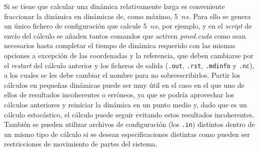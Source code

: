             Si se tiene que calcular una dinámica relativamente larga es conveniente fraccionar la dinámica en dinámicas de, como máximo, 5~$ns$. Para ello se genera un único fichero de configuración que calcule 5~$ns$, por ejemplo, y en el \textit{script} de envío del cálculo se añaden tantos comandos que activen \textit{pmed.cuda} como sean necesarios hasta completar el tiempo de dinámica requerido con las mismas opciones a excepción de las coordenadas y la referencia, que deben cambiarse por el \textit{restart} del cálculo anterior y los ficheros de salida (\texttt{.out}, \texttt{.rst}, \texttt{.mdinfo} y \texttt{.nc}), a los cuales se les debe cambiar el nombre para no sobreescribirlos. Partir los cálculos en pequeñas dinámicas puede ser muy útil en el caso en el que uno de ellos de resultados incoherentes o erróneos, ya que se podría aprovechar los cálculos anteriores y reiniciar la dinámica en un punto medio y, dado que es un cálculo estocástico, el cálculo puede seguir evitando estos resultados incoherentes. También se pueden utilizar archivos de configuración (los \texttt{.in}) distintos dentro de un mismo tipo de cálculo si se desean especificaciones distintas como pueden ser restricciones de movimiento de partes del sistema.\par
        
